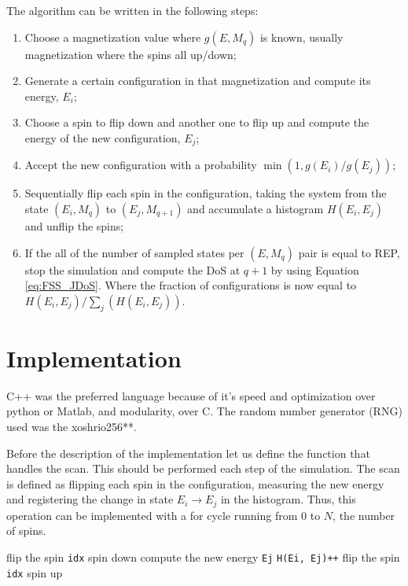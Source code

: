 The algorithm can be written in the following steps:
\begin{enumerate}
\item Choose a magnetization value where $g(E, M_q)$ is known, usually magnetization where the spins all up/down;
\item Generate a certain configuration in that magnetization and compute its energy, $E_i$;                                                                                                                                       
\item Choose a spin to flip down and another one to flip up and compute the energy of the new configuration, $E_j$;
\item Accept the new configuration with a probability $\min(1, g(E_i)/g(E_j))$;
\item Sequentially flip each spin in the configuration, taking the system from the state $(E_i, M_q)$ to $(E_j, M_{q+1})$ and accumulate a histogram $H(E_i, E_j)$ and unflip the spins;
\item If the all of the number of sampled states per $(E,M_{q})$ pair is equal to REP, stop the simulation and compute the DoS at $q+1$ by using Equation \ref{eq:FSS_JDoS}. Where the fraction of configurations is now equal to $H(E_i, E_j)/\sum_j(H(E_i,E_j))$.
\end{enumerate}

\section{Implementation}

	C++ was the preferred language because of it's speed and optimization over python or Matlab, and modularity, over C. The random number generator (RNG) used was the xoshrio256**.

	Before the description of the implementation let us define the function that handles the scan. This should be performed each step of the simulation. The scan is defined as flipping each spin in the configuration, measuring the new energy and registering the change in state $E_i \rightarrow E_j$ in the histogram. Thus, this operation can be implemented with a for cycle running from $0$ to $N$, the number of spins.
\begin{algorithm}
	\begin{algorithmic}[1]
			\State flip the spin \texttt{idx} spin down
			\State compute the new energy \texttt{Ej}
			\State \texttt{H(Ei, Ej)++}
			\State flip the spin \texttt{idx} spin up
		\EndFor
	\EndFunction
	\end{algorithmic} 
\end{algorithm} 

